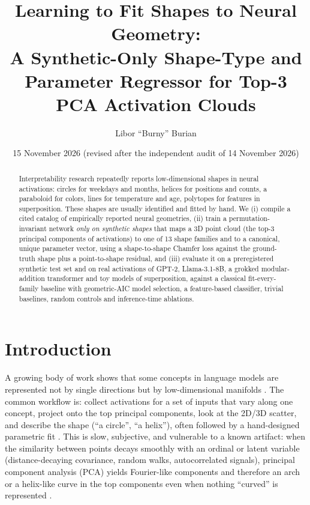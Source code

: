 \documentclass[10pt]{article}
\title{Learning to Fit Shapes to Neural Geometry:\\ A Synthetic-Only Shape-Type and Parameter Regressor for Top-3 PCA Activation Clouds}
\author{Libor ``Burny'' Burian}
\date{15 November 2026 (revised after the independent audit of 14 November 2026)}
\begin{document}
\maketitle

\begin{abstract}
Interpretability research repeatedly reports low-dimensional shapes in neural activations: circles for weekdays and months, helices for positions and counts, a paraboloid for colors, lines for temperature and age, polytopes for features in superposition. These shapes are usually identified and fitted by hand. We (i) compile a cited catalog of empirically reported neural geometries, (ii) train a permutation-invariant network \emph{only on synthetic shapes} that maps a 3D point cloud (the top-3 principal components of activations) to one of 13 shape families and to a canonical, unique parameter vector, using a shape-to-shape Chamfer loss against the ground-truth shape plus a point-to-shape residual, and (iii) evaluate it on a preregistered synthetic test set and on real activations of GPT-2, Llama-3.1-8B, a grokked modular-addition transformer and toy models of superposition, against a classical fit-every-family baseline with geometric-AIC model selection, a feature-based classifier, trivial baselines, random controls and inference-time ablations.

\end{abstract}

\section{Introduction}
A growing body of work shows that some concepts in language models are represented not by single directions but by low-dimensional manifolds \citep{engels2025notall,bhalla2026sae,gurnee2025linebreaks}. The common workflow is: collect activations for a set of inputs that vary along one concept, project onto the top principal components, look at the 2D/3D scatter, and describe the shape (``a circle'', ``a helix''), often followed by a hand-designed parametric fit \citep{kantamneni2025trig}. This is slow, subjective, and vulnerable to a known artifact: when the similarity between points decays smoothly with an ordinal or latent variable (distance-decaying covariance, random walks, autocorrelated signals), principal component analysis (PCA) yields Fourier-like components and therefore an arch or a helix-like curve in the top components even when nothing ``curved'' is represented \citep{novembre2008horseshoe,diaconis2008horseshoes,antognini2018walks,shinn2023phantom}.
\end{document}
